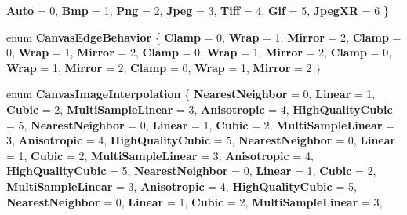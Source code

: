 \begin{DoxyCompactItemize}
{\bfseries Auto} = 0, 
{\bfseries Bmp} = 1, 
{\bfseries Png} = 2, 
{\bfseries Jpeg} = 3, 
\newline
{\bfseries Tiff} = 4, 
{\bfseries Gif} = 5, 
{\bfseries Jpeg\+XR} = 6
 \}
\item 
\mbox{\label{namespace_microsoft_1_1_graphics_1_1_canvas_a0820dd282edd1b22994fc94021da353e}} 
enum {\bfseries Canvas\+Edge\+Behavior} \{ \newline
{\bfseries Clamp} = 0, 
{\bfseries Wrap} = 1, 
{\bfseries Mirror} = 2, 
{\bfseries Clamp} = 0, 
\newline
{\bfseries Wrap} = 1, 
{\bfseries Mirror} = 2, 
{\bfseries Clamp} = 0, 
{\bfseries Wrap} = 1, 
\newline
{\bfseries Mirror} = 2, 
{\bfseries Clamp} = 0, 
{\bfseries Wrap} = 1, 
{\bfseries Mirror} = 2, 
\newline
{\bfseries Clamp} = 0, 
{\bfseries Wrap} = 1, 
{\bfseries Mirror} = 2
 \}
\item 
\mbox{\label{namespace_microsoft_1_1_graphics_1_1_canvas_abc4f24be9a610e40780a91ad57c2e1c3}} 
enum {\bfseries Canvas\+Image\+Interpolation} \{ \newline
{\bfseries Nearest\+Neighbor} = 0, 
{\bfseries Linear} = 1, 
{\bfseries Cubic} = 2, 
{\bfseries Multi\+Sample\+Linear} = 3, 
\newline
{\bfseries Anisotropic} = 4, 
{\bfseries High\+Quality\+Cubic} = 5, 
{\bfseries Nearest\+Neighbor} = 0, 
{\bfseries Linear} = 1, 
\newline
{\bfseries Cubic} = 2, 
{\bfseries Multi\+Sample\+Linear} = 3, 
{\bfseries Anisotropic} = 4, 
{\bfseries High\+Quality\+Cubic} = 5, 
\newline
{\bfseries Nearest\+Neighbor} = 0, 
{\bfseries Linear} = 1, 
{\bfseries Cubic} = 2, 
{\bfseries Multi\+Sample\+Linear} = 3, 
\newline
{\bfseries Anisotropic} = 4, 
{\bfseries High\+Quality\+Cubic} = 5, 
{\bfseries Nearest\+Neighbor} = 0, 
{\bfseries Linear} = 1, 
\newline
{\bfseries Cubic} = 2, 
{\bfseries Multi\+Sample\+Linear} = 3, 
{\bfseries Anisotropic} = 4, 
{\bfseries High\+Quality\+Cubic} = 5, 
\newline
{\bfseries Nearest\+Neighbor} = 0, 
{\bfseries Linear} = 1, 
{\bfseries Cubic} = 2, 
{\bfseries Multi\+Sample\+Linear} = 3, 
\newline

\end{DoxyCompactItemize}
